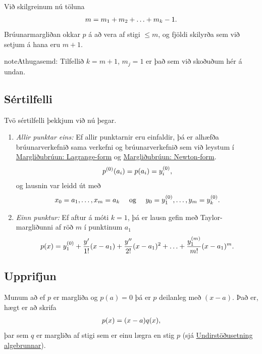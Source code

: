 \documentclass[letterpaper,10pt,icelandic]{sphinxmanual}
\begin{document}
Við skilgreinum nú töluna
\begin{gather}
\begin{split}m = m_1 + m_2 + \ldots + m_k - 1.\end{split}\notag
\end{gather}
Brúunarmargliðan okkar \(p\) á að vera af stigi \(\leq m\), og
fjöldi skilyrða sem við setjum á hana eru \(m+1\).

\begin{notice}{note}{Athugasemd:}
Tilfellið \(k=m+1\), \(m_j=1\) er það sem við skoðuðum hér á undan.
\end{notice}


\subsection{Sértilfelli}
\label{kafli03:sertilfelli}
Tvö sértilfelli þekkjum við nú þegar.
\begin{enumerate}
\item {} 
\emph{Allir punktar eins:} Ef allir punktarnir eru einfaldir, þá er
alhæfða brúunarverkefnið sama verkefni og brúunarverkefnið sem við
leystum í {\hyperref[kafli03:margliubruun-lagrange-form]{Margliðubrúun: Lagrange-form}} og {\hyperref[kafli03:margliubruun-newton-form]{Margliðubrúun: Newton-form}}.
\begin{gather}
\begin{split}p^{(0)}(a_i) = p(a_i) = y_i^{(0)},\end{split}\notag
\end{gather}
og lausnin var leidd út með
\begin{gather}
\begin{split}x_0=a_1,\dots,x_m=a_k \quad \text{ og } \quad
y_0=y_1^{(0)},\dots,y_m=y_k^{(0)}.\end{split}\notag
\end{gather}
\item {} 
\emph{Einn punktur:} Ef aftur á móti \(k = 1\), þá er lausn gefin
með Taylor-margliðunni af röð \(m\) í punktinum \(a_1\)
\begin{gather}
\begin{split}p(x) = y_1^{(0)} + \frac{y'}{1!}(x - a_1) + \frac{y''}{2!}(x - a_1)^2 +
  \ldots + \frac{y_1^{(m)}}{m!}(x - a_1)^m.\end{split}\notag
\end{gather}
\end{enumerate}


\subsection{Upprifjun}
\label{kafli03:upprifjun}
Munum að ef \(p\) er margliða og \(p(a)=0\) þá er \(p\)
deilanleg með \((x-a)\). Það er, hægt er að skrifa
\begin{gather}
\begin{split}p(x) = (x-a)q(x),\end{split}\notag
\end{gather}
þar sem \(q\) er margliða af stigi sem er einu lægra en stig
\(p\) (sjá \href{http://m.xn--st-2ia.is/fletta/undirst\%C3\%B6\%C3\%B0usetning/algebrunnar?device=desktop}{Undirstöðusetning algebrunnar}).
\end{document}
